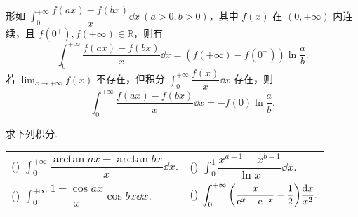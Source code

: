\begin{theorem}
    形如 $\displaystyle\int_{0}^{+\infty}\dfrac{f(ax)-f(bx)}{x}\dd x~ (a>0,b>0)$，其中 $f(x)$ 在 $(0,+\infty)$ 内连续，且 $f(0^+),f(+\infty)\in\mathbb{R} $，则有
    $$\int_{0}^{+\infty}\dfrac{f(ax)-f(bx)}{x}\dd x=(f(+\infty)-f(0^+))\ln\dfrac{a}{b}.$$
    若 $\displaystyle\lim_{x\to+\infty}f(x)$ 不存在，但积分 $\displaystyle\int_{0}^{+\infty}\dfrac{f(x)}{x}\dd x$ 存在，则
    $$\int_{0}^{+\infty}\dfrac{f(ax)-f(bx)}{x}\dd x=-f(0)\ln\dfrac{a}{b}.$$
\end{theorem}

\begin{example}
    求下列积分.
    \setcounter{magicrownumbers}{0}
    \begin{table}[H]
        \centering
        \begin{tabular}{l | l}
            (\rownumber{}) $\displaystyle\int_{0}^{+\infty}\dfrac{\arctan ax-\arctan bx}{x}\dd x.$ & (\rownumber{}) $\displaystyle\int_{0}^{1}\dfrac{x^{a-1}-x^{b-1}}{\ln x}\dd x.$                                                \\
            (\rownumber{}) $\displaystyle\int_{0}^{+\infty}\dfrac{1-\cos ax}{x}\cos bx\dd x.$      & (\rownumber{}) $\displaystyle\int_{0}^{+\infty}\qty(\dfrac{x}{\mathrm{e} ^x-\mathrm{e} ^{-x}}-\dfrac{1}{2})\dfrac{\dd x}{x^2}.$
        \end{tabular}
    \end{table}
\end{example}
